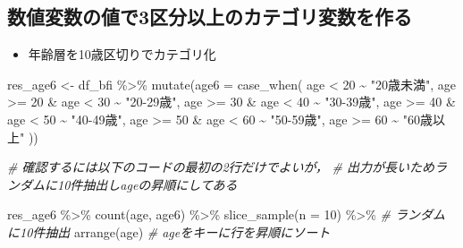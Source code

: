 \documentclass[
  xelatex,ja=standard, b5paper]{bxjsbook}
\newenvironment{Shaded}{\begin{snugshade}}{\end{snugshade}}
\newcommand{\AttributeTok}[1]{\textcolor[rgb]{0.77,0.63,0.00}{#1}}
\newcommand{\CommentTok}[1]{\textcolor[rgb]{0.56,0.35,0.01}{\textit{#1}}}
\newcommand{\DecValTok}[1]{\textcolor[rgb]{0.00,0.00,0.81}{#1}}
\newcommand{\FunctionTok}[1]{\textcolor[rgb]{0.00,0.00,0.00}{#1}}
\newcommand{\NormalTok}[1]{#1}
\newcommand{\OtherTok}[1]{\textcolor[rgb]{0.56,0.35,0.01}{#1}}
\newcommand{\SpecialCharTok}[1]{\textcolor[rgb]{0.00,0.00,0.00}{#1}}
\newcommand{\StringTok}[1]{\textcolor[rgb]{0.31,0.60,0.02}{#1}}
\providecommand{\tightlist}{%
  \setlength{\itemsep}{0pt}\setlength{\parskip}{0pt}}
\begin{document}
\hypertarget{ux6570ux5024ux5909ux6570ux306eux5024ux30673ux533aux5206ux4ee5ux4e0aux306eux30abux30c6ux30b4ux30eaux5909ux6570ux3092ux4f5cux308b}{%
\subsection{数値変数の値で3区分以上のカテゴリ変数を作る}\label{ux6570ux5024ux5909ux6570ux306eux5024ux30673ux533aux5206ux4ee5ux4e0aux306eux30abux30c6ux30b4ux30eaux5909ux6570ux3092ux4f5cux308b}}

\begin{itemize}
\tightlist
\item
  年齢層を10歳区切りでカテゴリ化
\end{itemize}

\begin{Shaded}
\begin{Highlighting}[]
\NormalTok{res\_age6 }\OtherTok{\textless{}{-}} 
\NormalTok{  df\_bfi }\SpecialCharTok{\%\textgreater{}\%} 
  \FunctionTok{mutate}\NormalTok{(}\AttributeTok{age6 =} \FunctionTok{case\_when}\NormalTok{(}
\NormalTok{    age }\SpecialCharTok{\textless{}} \DecValTok{20}              \SpecialCharTok{\textasciitilde{}} \StringTok{"20歳未満"}\NormalTok{, }
\NormalTok{    age }\SpecialCharTok{\textgreater{}=} \DecValTok{20}  \SpecialCharTok{\&}\NormalTok{ age }\SpecialCharTok{\textless{}} \DecValTok{30} \SpecialCharTok{\textasciitilde{}} \StringTok{"20{-}29歳"}\NormalTok{, }
\NormalTok{    age }\SpecialCharTok{\textgreater{}=} \DecValTok{30}  \SpecialCharTok{\&}\NormalTok{ age }\SpecialCharTok{\textless{}} \DecValTok{40} \SpecialCharTok{\textasciitilde{}} \StringTok{"30{-}39歳"}\NormalTok{,}
\NormalTok{    age }\SpecialCharTok{\textgreater{}=} \DecValTok{40}  \SpecialCharTok{\&}\NormalTok{ age }\SpecialCharTok{\textless{}} \DecValTok{50} \SpecialCharTok{\textasciitilde{}} \StringTok{"40{-}49歳"}\NormalTok{,}
\NormalTok{    age }\SpecialCharTok{\textgreater{}=} \DecValTok{50}  \SpecialCharTok{\&}\NormalTok{ age }\SpecialCharTok{\textless{}} \DecValTok{60} \SpecialCharTok{\textasciitilde{}} \StringTok{"50{-}59歳"}\NormalTok{,}
\NormalTok{    age }\SpecialCharTok{\textgreater{}=} \DecValTok{60}             \SpecialCharTok{\textasciitilde{}} \StringTok{"60歳以上"}  
\NormalTok{  ))}

\CommentTok{\# 確認するには以下のコードの最初の2行だけでよいが，}
\CommentTok{\# 出力が長いためランダムに10件抽出しageの昇順にしてある}

\NormalTok{res\_age6 }\SpecialCharTok{\%\textgreater{}\%} 
  \FunctionTok{count}\NormalTok{(age, age6) }\SpecialCharTok{\%\textgreater{}\%} 
  \FunctionTok{slice\_sample}\NormalTok{(}\AttributeTok{n =} \DecValTok{10}\NormalTok{) }\SpecialCharTok{\%\textgreater{}\%} \CommentTok{\# ランダムに10件抽出}
  \FunctionTok{arrange}\NormalTok{(age)             }\CommentTok{\# ageをキーに行を昇順にソート}
\end{Highlighting}
\end{Shaded}
\end{document}
